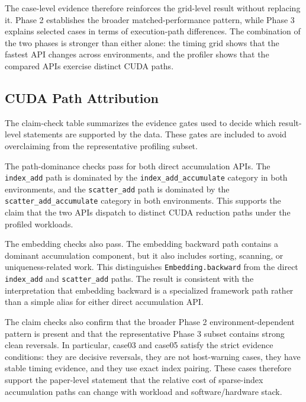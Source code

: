 

The case-level evidence therefore reinforces the grid-level result without replacing it. Phase 2 establishes the broader matched-performance pattern, while Phase 3 explains selected cases in terms of execution-path differences. The combination of the two phases is stronger than either alone: the timing grid shows that the fastest API changes across environments, and the profiler shows that the compared APIs exercise distinct CUDA paths.

\subsection{CUDA Path Attribution}

The claim-check table summarizes the evidence gates used to decide which result-level statements are supported by the data. These gates are included to avoid overclaiming from the representative profiling subset.



The path-dominance checks pass for both direct accumulation APIs. The \texttt{index\_add} path is dominated by the \texttt{index\_add\_accumulate} category in both environments, and the \texttt{scatter\_add} path is dominated by the \texttt{scatter\_add\_accumulate} category in both environments. This supports the claim that the two APIs dispatch to distinct CUDA reduction paths under the profiled workloads.

The embedding checks also pass. The embedding backward path contains a dominant accumulation component, but it also includes sorting, scanning, or uniqueness-related work. This distinguishes \texttt{Embedding.backward} from the direct \texttt{index\_add} and \texttt{scatter\_add} paths. The result is consistent with the interpretation that embedding backward is a specialized framework path rather than a simple alias for either direct accumulation API.

The claim checks also confirm that the broader Phase 2 environment-dependent pattern is present and that the representative Phase 3 subset contains strong clean reversals. In particular, case03 and case05 satisfy the strict evidence conditions: they are decisive reversals, they are not host-warning cases, they have stable timing evidence, and they use exact index pairing. These cases therefore support the paper-level statement that the relative cost of sparse-index accumulation paths can change with workload and software/hardware stack.


